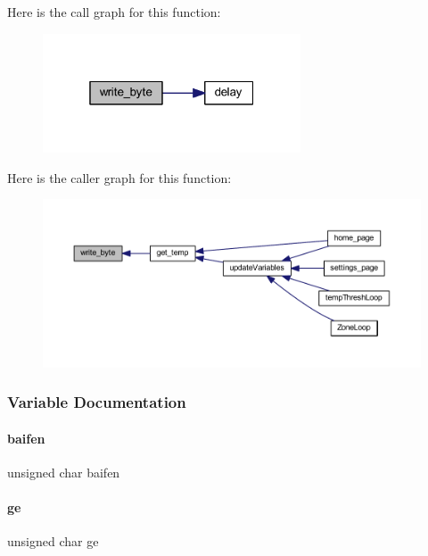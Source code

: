Here is the call graph for this function\+:
\nopagebreak
\begin{figure}[H]
\begin{center}
\leavevmode
\includegraphics[width=217pt]{a00047_ae8485e14c60e10731e2a3dcdc723b099_cgraph}
\end{center}
\end{figure}
Here is the caller graph for this function\+:
\nopagebreak
\begin{figure}[H]
\begin{center}
\leavevmode
\includegraphics[width=350pt]{a00047_ae8485e14c60e10731e2a3dcdc723b099_icgraph}
\end{center}
\end{figure}


\subsubsection{Variable Documentation}
\mbox{\label{a00047_a2f5f1bfe20a936c734e18ed92ba9ab8a}} 
\paragraph{baifen}
{\footnotesize\ttfamily unsigned char baifen}

\mbox{\label{a00047_aacc718b9b08ad36f34a1e15859bf8201}} 
\paragraph{ge}
{\footnotesize\ttfamily unsigned char ge}


